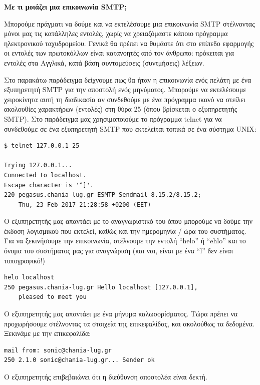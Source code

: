 \begin{inthebox}
\textbf{Με τι μοιάζει μια επικοινωνία SMTP;}

Μπορούμε πράγματι να δούμε και να εκτελέσουμε μια επικοινωνία SMTP στέλνοντας μόνοι μας τις κατάλληλες εντολές, χωρίς να χρειαζόμαστε κάποιο πρόγραμμα ηλεκτρονικού ταχυδρομείου. Γενικά θα πρέπει να θυμάστε ότι στο επίπεδο εφαρμογής οι εντολές των πρωτοκόλλων είναι κατανοητές από τον άνθρωπο: πρόκειται για εντολές στα Αγγλικά, κατά βάση συντομεύσεις (συντμήσεις) λέξεων.

Στο παρακάτω παράδειγμα δείχνουμε πως θα ήταν η επικοινωνία ενός πελάτη με ένα εξυπηρετητή SMTP για την αποστολή ενός μηνύματος. Μπορούμε να εκτελέσουμε χειροκίνητα αυτή τη διαδικασία αν συνδεθούμε με ένα πρόγραμμα ικανό να στείλει ακολουθίες χαρακτήρων (εντολές) στη θύρα 25 (όπου βρίσκεται ο εξυπηρετητής SMTP). Στο παράδειγμα μας χρησιμοποιούμε το πρόγραμμα telnet για να συνδεθούμε σε ένα εξυπηρετητή SMTP που εκτελείται τοπικά σε ένα σύστημα UNIX:

\begin{verbatim}
$ telnet 127.0.0.1 25

Trying 127.0.0.1...
Connected to localhost.
Escape character is '^]'.
220 pegasus.chania-lug.gr ESMTP Sendmail 8.15.2/8.15.2; 
    Thu, 23 Feb 2017 21:28:58 +0200 (EET)
\end{verbatim}

Ο εξυπηρετητής μας απαντάει με το αναγνωριστικό του όπου μπορούμε να δούμε την έκδοση λογισμικού που εκτελεί, καθώς και την ημερομηνία / ώρα του συστήματος. Για να ξεκινήσουμε την επικοινωνία, στέλνουμε την εντολή ``helo'' ή ``ehlo'' και το όνομα του συστήματος μας για αναγνώριση (και ναι, είναι με ένα ``l'' δεν είναι τυπογραφικό!)

\begin{verbatim}
helo localhost
250 pegasus.chania-lug.gr Hello localhost [127.0.0.1],
    pleased to meet you
\end{verbatim}

Ο εξυπηρετητής μας απαντάει με ένα μήνυμα καλωσορίσματος. Τώρα πρέπει να προχωρήσουμε στέλνοντας τα στοιχεία της επικεφαλίδας, και ακολούθως τα δεδομένα. Ξεκινάμε με την επικεφαλίδα:

\begin{verbatim}
mail from: sonic@chania-lug.gr
250 2.1.0 sonic@chania-lug.gr... Sender ok
\end{verbatim}

Ο εξυπηρετητής επιβεβαιώνει ότι η διεύθυνση αποστολέα είναι δεκτή.


\end{inthebox}
